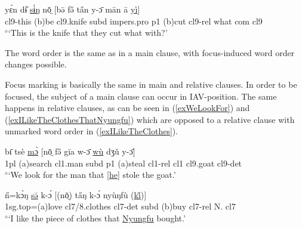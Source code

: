 \documentclass[10pt,twoside]{article}
\newcommand{\gl}[1]{`#1'}
\def\VSP{\vspace{0pt}}
\newcommand{\cl}[1]{{\sc cl#1}}
\newcommand{\pref}[1]{(\ref{#1})}
\def\elicited{$^\diamond$}
\def\ih{ɩ}
\newcommand{\comment}[1]{\textcolor{blue}{\emph{#1}}}
\begin{document}
\begin{exe}
	\ex \label{exTheKnifeTheyCutWhat}	

		\gll yɛ́n dɨ̋ \uline{sɨ̀ŋ} nō̤ [bə̄ fə̋ ta̋n y-ɔ̄ mān ā \uline{yì}]		\\
		\cl9-this ({\sc b})be \cl9.knife {\sc subd} {\sc impers.pro} {\sc p1} ({\sc b})cut \cl9-{\sc rel} what {\sc com} \cl9 	\\
		\glt \VSP \elicited \gl{This is the knife that they cut what with?}

\end{exe}%


The word order is the same as in a main clause, with focus-induced word order
changes possible.

Focus marking is basically the same in main and relative clauses. In order to be focused, 
the subject of a main clause can occur in IAV-position. The same happens in relative clauses, as can be 
seen in \pref{exWeLookFor} and \pref{exILikeTheClothesThatNyungfu} which are opposed to a relative clause with unmarked 
word order in \pref{exILikeTheClothes}.

\begin{exe}
	\ex \label{exWeLookFor}	

		\gll 	b{\=\ih} tsè \uline{mɔ̀} [nō̤ fə̋ gīa w-ɔ̄ \uline{wù} dʒǔ y-ɔ̄]		\\
			1{\sc pl} ({\sc a})search \cl1.man {\sc subd} {\sc p1} ({\sc a})steal \cl1-{\sc rel} \cl1  \cl9.goat \cl9-{\sc det}\\
		\glt \VSP \elicited \gl{We look for the man that [\uline{he}] stole the goat.}
		
\end{exe}%

\begin{exe}
	\ex \label{exILikeTheClothesThatNyungfu}	

		\gll n̋=kɔ̀ŋ \uline{sə̄} k-ɔ́ [(nō̤) ta̋ŋ k-ɔ́ nyùŋfù (\uline{ki̋})]			\\
		{\sc 1sg.top}=({\sc a})love \cl7/8.clothes \cl7-{\sc det} {\sc subd} ({\sc b})buy \cl7-{\sc rel} N. \cl7 	\\
		\glt \VSP \elicited \gl{I like the piece of clothes that \uline{Nyungfu} bought.}
		
\end{exe}%
\end{document}
